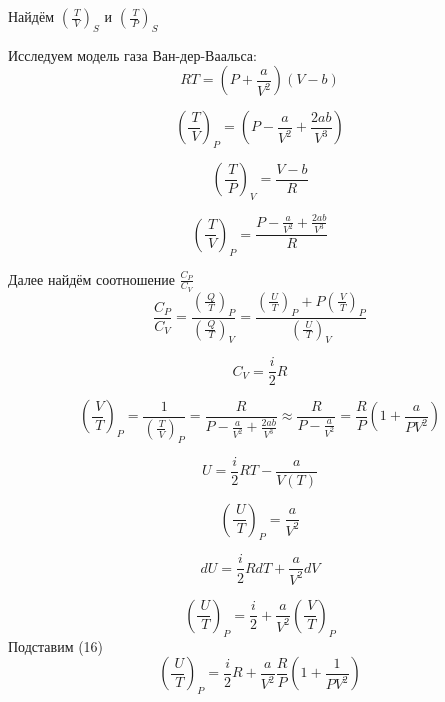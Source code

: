 \documentclass[a4paper,12pt]{article}
\begin{document}
Найдём $\left ( \frac{\ T}{\ V}\right )_S$ и $\left ( \frac{\ T}{\ P}\right )_S$

Исследуем модель газа Ван-дер-Ваальса:
\begin{equation}
RT = (P + \frac{a}{V^2})(V - b)
\end{equation}

\begin{equation}
\left ( \frac{\ T}{\ V}\right )_P = (P - \frac{a}{V^2} + \frac{2ab}{V^3}) 
\end{equation}

\begin{equation}
\left ( \frac{\ T}{\ P}\right )_V = \frac{V - b}{R}
\end{equation}

\begin{equation}
\left ( \frac{\ T}{\ V}\right )_P = \frac{P - \frac{a}{V^2} + \frac{2ab}{V^3}}{R}
\end{equation}

Далее найдём соотношение $\frac{C_P}{C_V}$
\begin{equation}
\frac{C_P}{C_V} = \frac{\left ( \frac{\ Q}{\ T}\right )_P}{\left ( \frac{\ Q}{\ T}\right )_V} = \frac{\left ( \frac{\ U}{\ T}\right )_P + P\left ( \frac{\ V}{\ T}\right )_P}{\left ( \frac{\ U}{\ T}\right )_V}
\end{equation}

\begin{equation}
C_V = \frac{i}{2}R
\end{equation}

\begin{equation}
\left ( \frac{\ V}{\ T}\right )_P = \frac{1}{\left ( \frac{\ T}{\ V}\right )_P} = \frac{R}{P - \frac{a}{V^2} + \frac{2ab}{V^3}} \approx \frac{R}{P - \frac{a}{V^2}} = \frac{R}{P}(1 + \frac{a}{PV^2})
\end{equation}

\begin{equation}
U = \frac{i}{2}RT - \frac{a}{V(T)}
\end{equation}

\begin{equation}
\left ( \frac{\ U}{\ T}\right )_P = \frac{a}{V^2}
\end{equation}

\begin{equation}
dU = \frac{i}{2}RdT + \frac{a}{V^2}dV
\end{equation}

\begin{equation}
\left ( \frac{\ U}{\ T}\right )_P = \frac{i}{2} + \frac{a}{V^2}\left ( \frac{\ V}{\ T}\right )_P
\end{equation}
Подставим (16)
\begin{equation}
\left ( \frac{\ U}{\ T}\right )_P = \frac{i}{2}R + \frac{a}{V^2}\frac{R}{P}(1 + \frac{1}{PV^2})
\end{equation}
\end{document}
